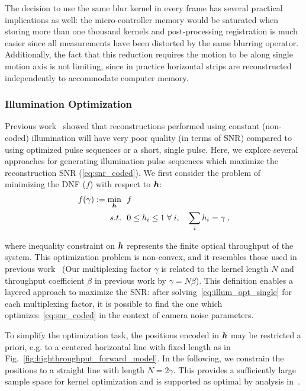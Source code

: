 The decision to use the same blur kernel in every frame has several practical implications as well: the micro-controller memory would be saturated when storing more than one thousand kernels and post-processing registration is much easier since all measurements have been distorted by the same blurring operator. Additionally, the fact that this reduction requires the motion to be along single motion axis is not limiting, since in practice horizontal strips are reconstructed independently to accommodate computer memory.

\subsubsection{Illumination Optimization}\label{sec:highthroughput:illum_opt}
Previous work~\cite{raskar2006coded, agrawal2009optimal} showed that reconstructions performed using constant (non-coded) illumination will have very poor quality (in terms of SNR) compared to using optimized pulse sequences or a short, single pulse. Here, we explore several approaches for generating illumination pulse sequences which maximize the reconstruction SNR (\eqref{eq:snr_coded}). We first consider the problem of minimizing the DNF ($f$) with respect to $\bm{h}$:
\begin{align}
    \begin{split}
        \label{eq:illum_opt_single}
        f(\gamma) := \min_{\bm{h}}&~~ f \\
          s.t. &~~0 \leq h_i \leq 1 \; \forall \; i, \quad
          \sum_{i} h_i = \gamma \:,
    \end{split}
\end{align}

\noindent where inequality constraint on $\bm{h}$ represents the finite optical throughput of the system.
This optimization problem is non-convex, and it resembles those used in previous work~\cite{raskar2006coded,agrawal2009optimal,Ma:15} (Our multiplexing factor $\gamma$ is related to the kernel length $N$ and throughput coefficient $\beta$ in previous work by $\gamma = N\beta$). This definition enables a layered approach to maximize the SNR: after solving~\eqref{eq:illum_opt_single} for each multiplexing factor, it is possible to find the one which optimizes~\eqref{eq:snr_coded} in the context of camera noise parameters.

To simplify the optimization task, the positions encoded in $\bm{h}$ may be restricted a priori, e.g. to a centered horizontal line with fixed length as in Fig.~\ref{fig:highthroughput_forward_model}. In the following, we constrain the positions to a straight line with length $N=2\gamma$. This provides a sufficiently large sample space for kernel optimization and is supported as optimal by analysis in~\cite{agrawal2009optimal}.

